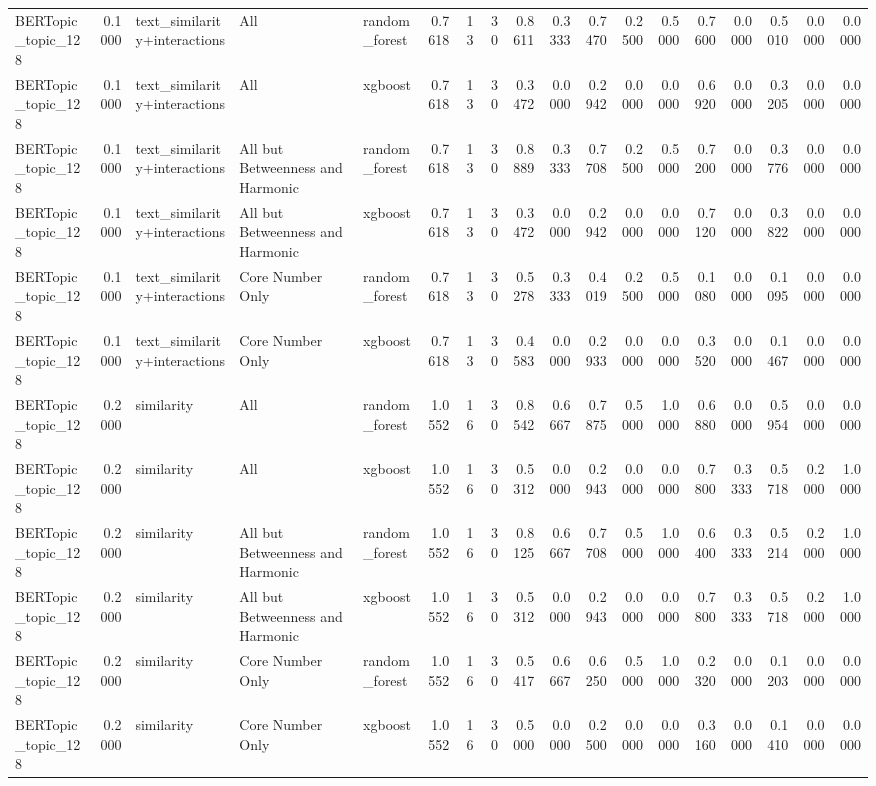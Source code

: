 \begin{tabular}{lrlllrrrrrrrrrrrrr}
BERTopic_topic_128 & 0.1000 & text_similarity+interactions & All & random_forest & 0.7618 & 13 & 30 & 0.8611 & 0.3333 & 0.7470 & 0.2500 & 0.5000 & 0.7600 & 0.0000 & 0.5010 & 0.0000 & 0.0000 \\
BERTopic_topic_128 & 0.1000 & text_similarity+interactions & All & xgboost & 0.7618 & 13 & 30 & 0.3472 & 0.0000 & 0.2942 & 0.0000 & 0.0000 & 0.6920 & 0.0000 & 0.3205 & 0.0000 & 0.0000 \\
BERTopic_topic_128 & 0.1000 & text_similarity+interactions & All but Betweenness and Harmonic & random_forest & 0.7618 & 13 & 30 & 0.8889 & 0.3333 & 0.7708 & 0.2500 & 0.5000 & 0.7200 & 0.0000 & 0.3776 & 0.0000 & 0.0000 \\
BERTopic_topic_128 & 0.1000 & text_similarity+interactions & All but Betweenness and Harmonic & xgboost & 0.7618 & 13 & 30 & 0.3472 & 0.0000 & 0.2942 & 0.0000 & 0.0000 & 0.7120 & 0.0000 & 0.3822 & 0.0000 & 0.0000 \\
BERTopic_topic_128 & 0.1000 & text_similarity+interactions & Core Number Only & random_forest & 0.7618 & 13 & 30 & 0.5278 & 0.3333 & 0.4019 & 0.2500 & 0.5000 & 0.1080 & 0.0000 & 0.1095 & 0.0000 & 0.0000 \\
BERTopic_topic_128 & 0.1000 & text_similarity+interactions & Core Number Only & xgboost & 0.7618 & 13 & 30 & 0.4583 & 0.0000 & 0.2933 & 0.0000 & 0.0000 & 0.3520 & 0.0000 & 0.1467 & 0.0000 & 0.0000 \\
BERTopic_topic_128 & 0.2000 & similarity & All & random_forest & 1.0552 & 16 & 30 & 0.8542 & 0.6667 & 0.7875 & 0.5000 & 1.0000 & 0.6880 & 0.0000 & 0.5954 & 0.0000 & 0.0000 \\
BERTopic_topic_128 & 0.2000 & similarity & All & xgboost & 1.0552 & 16 & 30 & 0.5312 & 0.0000 & 0.2943 & 0.0000 & 0.0000 & 0.7800 & 0.3333 & 0.5718 & 0.2000 & 1.0000 \\
BERTopic_topic_128 & 0.2000 & similarity & All but Betweenness and Harmonic & random_forest & 1.0552 & 16 & 30 & 0.8125 & 0.6667 & 0.7708 & 0.5000 & 1.0000 & 0.6400 & 0.3333 & 0.5214 & 0.2000 & 1.0000 \\
BERTopic_topic_128 & 0.2000 & similarity & All but Betweenness and Harmonic & xgboost & 1.0552 & 16 & 30 & 0.5312 & 0.0000 & 0.2943 & 0.0000 & 0.0000 & 0.7800 & 0.3333 & 0.5718 & 0.2000 & 1.0000 \\
BERTopic_topic_128 & 0.2000 & similarity & Core Number Only & random_forest & 1.0552 & 16 & 30 & 0.5417 & 0.6667 & 0.6250 & 0.5000 & 1.0000 & 0.2320 & 0.0000 & 0.1203 & 0.0000 & 0.0000 \\
BERTopic_topic_128 & 0.2000 & similarity & Core Number Only & xgboost & 1.0552 & 16 & 30 & 0.5000 & 0.0000 & 0.2500 & 0.0000 & 0.0000 & 0.3160 & 0.0000 & 0.1410 & 0.0000 & 0.0000 \\

\end{tabular}
